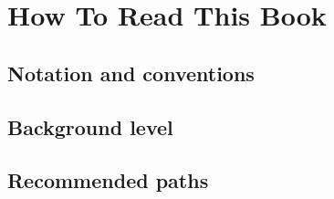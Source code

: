 \chapter{How To Read This Book}

\section{Notation and conventions}













\section{Background level}

\section{Recommended paths}
